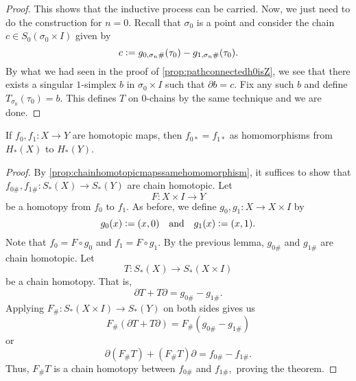 \documentclass[12pt]{article}
\begin{document}
\begin{proof}
	This shows that the inductive process can be carried. Now, we just need to do the construction for $n = 0.$ Recall that $\sigma_0$ is a point and consider the chain $c \in S_0(\sigma_0\times I)$ given by
	\begin{equation*} 
		c \vcentcolon= g_{0, \sigma_n\#}(\tau_0) - g_{1, \sigma_n\#}(\tau_0).
	\end{equation*}
	By what we had seen in the proof of \cref{prop:pathconnectedh0isZ}, we see that there exists a singular $1$-simplex $b$ in $\sigma_0\times I$ such that $\partial b = c.$ Fix any such $b$ and define $T_{\sigma_0}(\tau_0) = b.$ This defines $T$ on $0$-chains by the same technique and we are done.
\end{proof}

\begin{thm} \label{thm:homotopicmapssamehomomorphism}
	If $f_0, f_1:X \to Y$ are homotopic maps, then $f_{0*} = f_{1*}$ as homomorphisms from $H_*(X)$ to $H_*(Y).$ 
\end{thm}
\begin{proof} 
	By \cref{prop:chainhomotopicmapssamehomomorphism}, it suffices to show that $f_{0\#}, f_{1\#}:S_*(X) \to S_*(Y)$ are chain homotopic. Let 
	\begin{equation*} 
		F:X\times I \to Y
	\end{equation*}
	be a homotopy from $f_0$ to $f_1.$ As before, we define $g_0, g_1:X \to X\times I$ by
	\begin{equation*} 
		g_{0}(x) \vcentcolon= (x, 0) \quad\text{and}\quad g_{1}(x) \vcentcolon= (x, 1).
	\end{equation*}
	Note that $f_0 = F\circ g_0$ and $f_1 = F \circ g_1.$ By the previous lemma, $g_{0\#}$ and $g_{1\#}$ are chain homotopic. Let
	\begin{equation*} 
		T:S_*(X) \to S_*(X\times I)
	\end{equation*}
	be a chain homotopy. That is, 
	\begin{equation*} 
		\partial T + T\partial = g_{0\#} - g_{1\#}.
	\end{equation*}
	Applying $F_\#:S_*(X\times I) \to S_*(Y)$ on both sides gives us
	\begin{equation*} 
		F_\#(\partial T + T\partial) = F_\#(g_{0\#} - g_{1\#})
	\end{equation*}
	or
	\begin{equation*} 
		\partial(F_\#T) + (F_\#T)\partial = f_{0\#} - f_{1\#}.
	\end{equation*}
	Thus, $F_{\#}T$ is a chain homotopy between $f_{0\#}$ and $f_{1\#},$ proving the theorem.
\end{proof}
\end{document}
